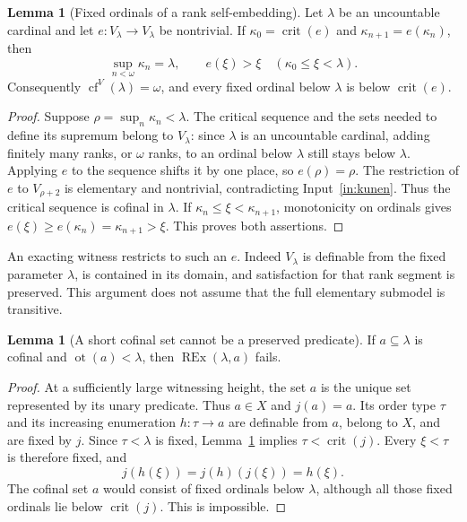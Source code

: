 \documentclass[11pt,letterpaper]{article}
\theoremstyle{definition}
\newtheorem{lemma}[definition]{Lemma}
\numberwithin{equation}{section}
\newcommand{\REx}{\operatorname{REx}}
\newcommand{\crit}{\operatorname{crit}}
\newcommand{\cf}{\operatorname{cf}}
\newcommand{\ot}{\operatorname{ot}}
\begin{document}
\begin{lemma}[Fixed ordinals of a rank self-embedding]\label{lem:critical}
Let $\lambda$ be an uncountable cardinal and let
$e:V_\lambda\to V_\lambda$ be nontrivial. If
$\kappa_0=\crit(e)$ and $\kappa_{n+1}=e(\kappa_n)$, then
\[
\sup_{n<\omega}\kappa_n=\lambda,
\qquad e(\xi)>\xi\quad(\kappa_0\le\xi<\lambda).
\]
Consequently $\cf^V(\lambda)=\omega$, and every fixed ordinal below
$\lambda$ is below $\crit(e)$.
\end{lemma}
\begin{proof}
Suppose $\rho=\sup_n\kappa_n<\lambda$. The critical sequence and the
sets needed to define its supremum belong to $V_\lambda$: since
$\lambda$ is an uncountable cardinal, adding finitely many ranks, or
$\omega$ ranks, to an ordinal below $\lambda$ still stays below
$\lambda$. Applying $e$ to the sequence shifts it by one place, so
$e(\rho)=\rho$. The restriction of $e$ to $V_{\rho+2}$ is elementary
and nontrivial, contradicting Input~\ref{in:kunen}. Thus the critical
sequence is cofinal in $\lambda$. If
$\kappa_n\le\xi<\kappa_{n+1}$, monotonicity on ordinals gives
$e(\xi)\ge e(\kappa_n)=\kappa_{n+1}>\xi$. This proves both assertions.
\end{proof}

An exacting witness restricts to such an $e$. Indeed $V_\lambda$ is
definable from the fixed parameter $\lambda$, is contained in its
domain, and satisfaction for that rank segment is preserved. This
argument does not assume that the full elementary submodel is
transitive.

\begin{lemma}[A short cofinal set cannot be a preserved predicate]\label{lem:cofinal}
If $a\subseteq\lambda$ is cofinal and $\ot(a)<\lambda$, then
$\REx(\lambda,a)$ fails.
\end{lemma}
\begin{proof}
At a sufficiently large witnessing height, the set $a$ is the unique
set represented by its unary predicate. Thus $a\in X$ and $j(a)=a$.
Its order type $\tau$ and its increasing enumeration $h:\tau\to a$
are definable from $a$, belong to $X$, and are fixed by $j$.
Since $\tau<\lambda$ is fixed, Lemma~\ref{lem:critical} implies
$\tau<\crit(j)$. Every $\xi<\tau$ is therefore fixed, and
\[
j(h(\xi))=j(h)(j(\xi))=h(\xi).
\]
The cofinal set $a$ would consist of fixed ordinals below $\lambda$,
although all those fixed ordinals lie below $\crit(j)$. This is
impossible.
\end{proof}
\end{document}
